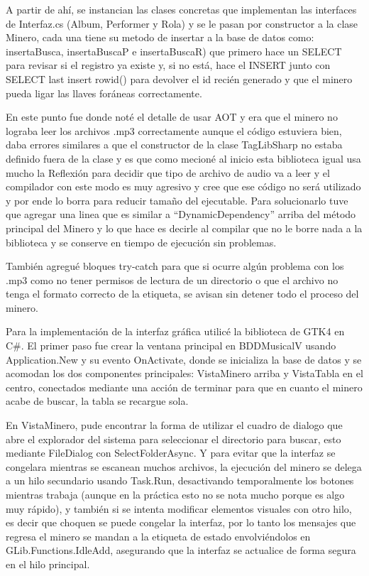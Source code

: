 \documentclass[12pt,letterpaper]{article}
\begin{document}
A partir de ahí, se instancian las clases concretas que implementan las interfaces de Interfaz.cs (Album, Performer y Rola) y se le pasan por constructor a la clase Minero, cada una tiene su metodo de insertar a la base de datos como: insertaBusca, insertaBuscaP e insertaBuscaR) que primero hace un SELECT para revisar si el registro ya existe y, si no está, hace el INSERT junto con SELECT last insert rowid()   para devolver el id recién generado y que el minero pueda ligar las llaves foráneas correctamente.

En este punto fue donde noté el detalle de usar AOT y era que el minero no lograba leer los archivos .mp3 correctamente aunque el código estuviera bien, daba errores similares a que el constructor de la clase TagLibSharp no estaba definido fuera de la clase y es que como mecioné al inicio esta biblioteca igual usa mucho la Reflexión para decidir que tipo de archivo de audio va a leer y el compilador con este modo es muy agresivo y cree que ese código no será utilizado y por ende lo borra para reducir tamaño del ejecutable. Para solucionarlo tuve que agregar una linea que es similar a ``DynamicDependency'' arriba del método principal del Minero y lo que hace es decirle al compilar que no le borre nada a la biblioteca y se conserve en tiempo de ejecución sin problemas.

También agregué bloques try-catch para que si ocurre algún problema con los .mp3 como no tener permisos de lectura de un directorio o que el archivo no tenga el formato correcto de la etiqueta, se avisan sin detener todo el proceso del minero.

\newpage
Para la implementación de la interfaz gráfica utilicé la biblioteca de GTK4 en C#. El primer paso fue crear la ventana principal en BDDMusicalV usando Application.New y su evento OnActivate, donde se inicializa la base de datos y se acomodan los dos componentes principales: VistaMinero arriba y VistaTabla en el centro, conectados mediante una acción de terminar para que en cuanto el minero acabe de buscar, la tabla se recargue sola.

En VistaMinero, pude encontrar la forma de utilizar el cuadro de dialogo que abre el explorador del sistema para seleccionar el directorio para buscar, esto mediante FileDialog con SelectFolderAsync. Y para evitar que la interfaz se congelara mientras se escanean muchos archivos, la ejecución del minero se delega a un hilo secundario usando Task.Run, desactivando temporalmente los botones mientras trabaja (aunque en la práctica esto no se nota mucho porque es algo muy rápido), y también si se intenta modificar elementos visuales con otro hilo, es decir que choquen se puede congelar la interfaz, por lo tanto los mensajes que regresa el minero se mandan a la etiqueta de estado envolviéndolos en GLib.Functions.IdleAdd, asegurando que la interfaz se actualice de forma segura en el hilo principal.
\end{document}
